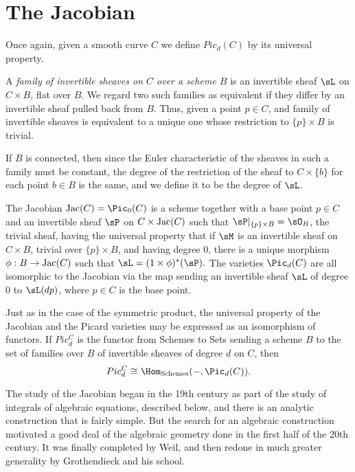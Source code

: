 \section{The Jacobian}

Once again, given a smooth curve $C$ we define $Pic_d(C)$ by its universal property.

\begin{definition}
 A \emph{family of invertible sheaves on $C$ over a scheme $B$} is an invertible sheaf $\sL$ on $C\times B$, flat over $B$. We regard two such
 families as equivalent if they differ by an invertible sheaf pulled back from $B$. Thus, given a point $p\in C$, and family of invertible sheaves
 is equivalent to a unique one whose restriction to $\{p\}\times B$ is trivial. 
 
 If $B$ is connected, then since the Euler characteristic of the sheaves in such a family must be constant, the degree of the restriction of 
 the sheaf to $C\times \{b\}$ for each point $b\in B$ is the same, and we define it to be the degree of $\sL$. 
 
 The Jacobian $\Jac(C) = \Pic_0(C)$ is a scheme together with a base point $p\in C$ and an invertible sheaf $\sP$ on $C\times \Jac(C)$ such
 that $\sP|_{\{p\}\times B} = \sO_B$, the trivial sheaf, having the universal property that if $\sM$ is an invertible sheaf on
 $C\times B$, trivial over $\{p\}\times B$, and having degree 0, there is a unique morphism $\phi: B \to \Jac(C)$ such that $\sL = (1\times \phi)^*(\sP).$
 The varieties $\Pic_d(C)$ are all isomorphic to the Jacobian via the map sending an invertible sheaf $\sL$ of degree 0 to $\sL(dp)$, where $p\in C$ is the
base point.
\end{definition}

Just as in the case of the symmetric product, the universal property of the Jacobian and the Picard
varieties may be expressed as an isomorphism of functors. If $Pic^C_d$ is the functor from Schemes to Sets
sending a scheme $B$ to the set of families over $B$ of invertible sheaves of degree $d$ on $C$, then
$$
Pic^C_d \cong \Hom_{\rm Schemes}(-, \Pic_d(C)).
$$

The study of the Jacobian began in the 19th century as part of the study of integrals of algebraic equations, described below, 
and there is an analytic construction that is fairly simple. But the search for an algebraic construction motivated a good deal of the
algebraic geometry done in the first half of the 20th century. It was finally completed by Weil, and then redone in much greater
generality by Grothendieck and his school.

